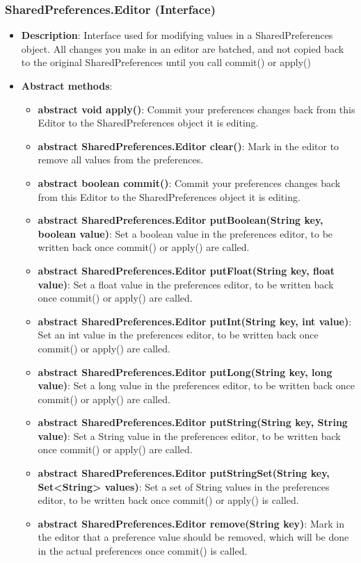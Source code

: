 \documentclass{report}
\begin{document}
    \subsubsection{SharedPreferences.Editor (Interface)}
    \begin{itemize}
        \item \textbf{Description}: Interface used for modifying values in a SharedPreferences object. All changes you make in an editor are batched, and not copied back to the original SharedPreferences until you call commit() or apply()
        \item \textbf{Abstract methods}:
            \begin{itemize}
                \item \textbf{abstract void	apply()}: Commit your preferences changes back from this Editor to the SharedPreferences object it is editing.
                \item \textbf{abstract SharedPreferences.Editor	clear()}: Mark in the editor to remove all values from the preferences.
                \item \textbf{abstract boolean	commit()}: Commit your preferences changes back from this Editor to the SharedPreferences object it is editing.
                \item \textbf{abstract SharedPreferences.Editor	putBoolean(String key, boolean value)}: Set a boolean value in the preferences editor, to be written back once commit() or apply() are called.
                \item \textbf{abstract SharedPreferences.Editor	putFloat(String key, float value)}: Set a float value in the preferences editor, to be written back once commit() or apply() are called.
                \item \textbf{abstract SharedPreferences.Editor	putInt(String key, int value)}: Set an int value in the preferences editor, to be written back once commit() or apply() are called.
                \item \textbf{abstract SharedPreferences.Editor	putLong(String key, long value)}: Set a long value in the preferences editor, to be written back once commit() or apply() are called.
                \item \textbf{abstract SharedPreferences.Editor	putString(String key, String value)}: Set a String value in the preferences editor, to be written back once commit() or apply() are called.
                \item \textbf{abstract SharedPreferences.Editor	putStringSet(String key, Set<String> values)}: Set a set of String values in the preferences editor, to be written back once commit() or apply() is called.
                \item \textbf{abstract SharedPreferences.Editor	remove(String key)}: Mark in the editor that a preference value should be removed, which will be done in the actual preferences once commit() is called.
            \end{itemize}


    \end{itemize}
\end{document}
